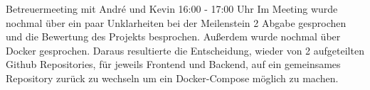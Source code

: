 \documentclass{article}
\begin{document}
    Betreuermeeting mit André und Kevin 16:00 - 17:00 Uhr
    Im Meeting wurde nochmal über ein paar Unklarheiten bei der Meilenstein 2 Abgabe gesprochen und die Bewertung des Projekts besprochen. Außerdem wurde nochmal über Docker gesprochen. Daraus resultierte die Entscheidung, wieder von 2 aufgeteilten Github Repositories, für jeweils Frontend und Backend, auf ein gemeinsames Repository zurück zu wechseln um ein Docker-Compose möglich zu machen.

\newpage



\end{document}
